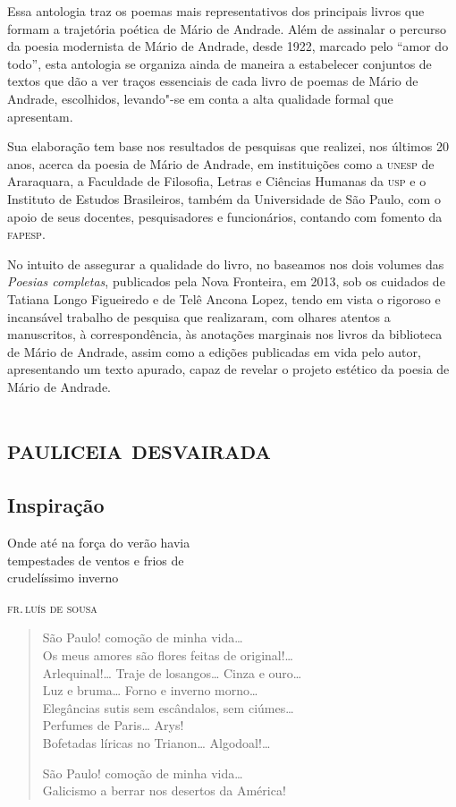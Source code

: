 
\noindent{}Essa antologia traz os poemas mais representativos dos principais livros que formam a trajetória poética de Mário de Andrade.
Além de assinalar o percurso da poesia modernista de Mário de Andrade,
desde 1922, marcado pelo ``amor do todo'', esta antologia
se organiza ainda de maneira a estabelecer conjuntos de textos que dão a
ver traços essenciais de cada livro de poemas de Mário de Andrade,
escolhidos, levando"-se em conta a alta qualidade formal que apresentam.

Sua elaboração tem base nos resultados de pesquisas que realizei, nos
últimos 20 anos, acerca da poesia de Mário de Andrade, em instituições
como a \textsc{unesp} de Araraquara, a Faculdade de Filosofia, Letras e Ciências
Humanas da \textsc{usp} e o Instituto de Estudos Brasileiros, também da
Universidade de São Paulo, com o apoio de seus docentes, pesquisadores e
funcionários, contando com fomento da \textsc{fapesp}.

No intuito de assegurar a qualidade do livro, no baseamos nos dois
volumes das \emph{Poesias completas}, publicados pela Nova Fronteira, em
2013, sob os cuidados de Tatiana Longo Figueiredo e de Telê Ancona
Lopez, tendo em vista o rigoroso e incansável trabalho de pesquisa que
realizaram, com olhares atentos a manuscritos, à correspondência, às
anotações marginais nos livros da biblioteca de Mário de Andrade, assim
como a edições publicadas em vida pelo autor, apresentando um texto
apurado, capaz de revelar o projeto estético da poesia de Mário de
Andrade.

\part{\textsc{pauliceia desvairada}}

\chapter{Inspiração}
\openany

{\setlength{\epigraphwidth}{.45\textwidth}
\epigraph{Onde até na força do verão havia\\
tempestades de ventos e frios de\\
crudelíssimo inverno}{\textsc{fr.\,luís de sousa}}}


\begin{verse}
São Paulo! comoção de minha vida\ldots{}\\
Os meus amores são flores feitas de original!\ldots{}\\
Arlequinal!\ldots{} Traje de losangos\ldots{} Cinza e ouro\ldots{}\\
Luz e bruma\ldots{} Forno e inverno morno\ldots{}\\
Elegâncias sutis sem escândalos, sem ciúmes\ldots{}\\
Perfumes de Paris\ldots{} Arys!\\
Bofetadas líricas no Trianon\ldots{} Algodoal!\ldots{}

São Paulo! comoção de minha vida\ldots{}\\
Galicismo a berrar nos desertos da América!
\end{verse}

